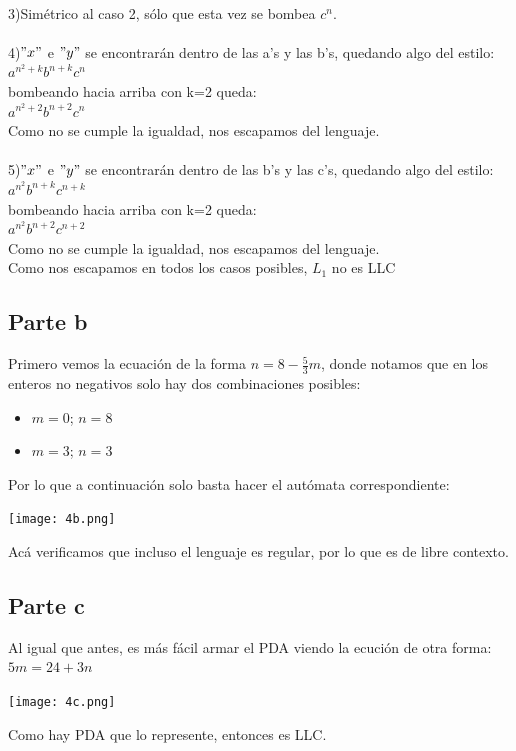 \documentclass[11pt,letterpaper]{article}
\begin{document}
 \\
3)Simétrico al caso 2, sólo que esta vez se bombea $c^n$. \\
 \\
4)$"x"$ e $"y"$ se encontrarán dentro de las a's y las b's, quedando algo del estilo: \\
\indent $a^{n^2+k}b^{n+k}c^n$ \\
\indent bombeando hacia arriba con k=2 queda: \\
\indent $a^{n^2+2}b^{n+2}c^n$ \\
\indent Como no se cumple la igualdad, nos escapamos del lenguaje. \\
 \\
5)$"x"$ e $"y"$ se encontrarán dentro de las b's y las c's, quedando algo del estilo: \\
\indent $a^{n^2}b^{n+k}c^{n+k}$ \\
\indent bombeando hacia arriba con k=2 queda: \\
\indent $a^{n^2}b^{n+2}c^{n+2}$ \\
\indent Como no se cumple la igualdad, nos escapamos del lenguaje. \\

\noindent Como nos escapamos en todos los casos posibles, $L_{1}$ no es LLC

\subsection{Parte b}
	Primero vemos la ecuación de la forma $n = 8 - \frac{5}{3} m$, donde notamos que en los enteros no negativos solo hay dos combinaciones posibles:
	\begin{itemize}
		\item $m=0$; $n=8$
		\item $m=3$; $n=3$
	\end{itemize}
	Por lo que a continuación solo basta hacer el autómata correspondiente:
	\begin{center}
	\texttt{[image: 4b.png]}
	\end{center}
	Acá verificamos que incluso el lenguaje es regular, por lo que es de libre contexto.
\subsection{Parte c}
	Al igual que antes, es más fácil armar el PDA viendo la ecución de otra forma: $5m = 24 + 3n$
	\begin{center}
	\texttt{[image: 4c.png]}
	\end{center}
	Como hay PDA que lo represente, entonces es LLC.
\end{document}
